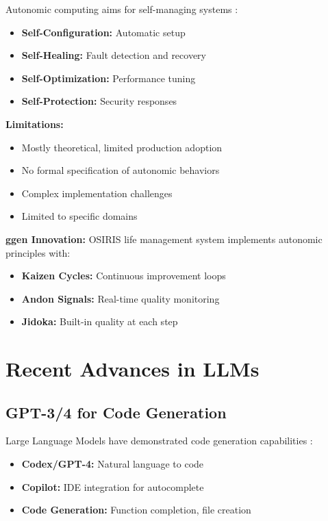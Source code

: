 Autonomic computing aims for self-managing systems \cite{kephart2003autonomic}:

\begin{itemize}
    \item \textbf{Self-Configuration:} Automatic setup
    \item \textbf{Self-Healing:} Fault detection and recovery
    \item \textbf{Self-Optimization:} Performance tuning
    \item \textbf{Self-Protection:} Security responses
\end{itemize}

\textbf{Limitations:}
\begin{itemize}
    \item Mostly theoretical, limited production adoption
    \item No formal specification of autonomic behaviors
    \item Complex implementation challenges
    \item Limited to specific domains
\end{itemize}

\textbf{ggen Innovation:} OSIRIS life management system implements autonomic principles with:
\begin{itemize}
    \item \textbf{Kaizen Cycles:} Continuous improvement loops
    \item \textbf{Andon Signals:} Real-time quality monitoring
    \item \textbf{Jidoka:} Built-in quality at each step
\end{itemize}

\section{Recent Advances in LLMs}

\subsection{GPT-3/4 for Code Generation}

Large Language Models have demonstrated code generation capabilities \cite{chen2021evaluating, openai2023gpt4}:

\begin{itemize}
    \item \textbf{Codex/GPT-4:} Natural language to code
    \item \textbf{Copilot:} IDE integration for autocomplete
    \item \textbf{Code Generation:} Function completion, file creation
\end{itemize}

